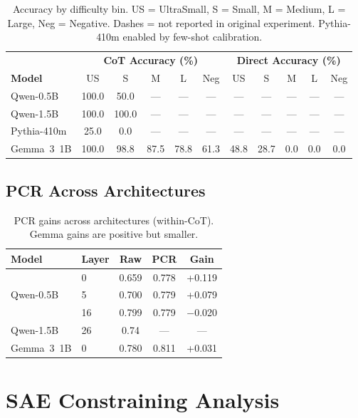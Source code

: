 \documentclass[11pt,twocolumn]{article}
\begin{document}
\begin{table}[h]
\centering
\small
\begin{tabular}{l|ccccc|ccccc}
\toprule
 & \multicolumn{5}{c|}{\textbf{CoT Accuracy (\%)}} & \multicolumn{5}{c}{\textbf{Direct Accuracy (\%)}} \\
\textbf{Model} & US & S & M & L & Neg & US & S & M & L & Neg \\
\midrule
Qwen-0.5B & 100.0 & 50.0 & --- & --- & --- & --- & --- & --- & --- & --- \\
Qwen-1.5B & 100.0 & 100.0 & --- & --- & --- & --- & --- & --- & --- & --- \\
Pythia-410m & 25.0 & 0.0 & --- & --- & --- & --- & --- & --- & --- & --- \\
Gemma~3~1B & 100.0 & 98.8 & 87.5 & 78.8 & 61.3 & 48.8 & 28.7 & 0.0 & 0.0 & 0.0 \\
\bottomrule
\end{tabular}
\caption{Accuracy by difficulty bin. US = UltraSmall, S = Small, M = Medium, L = Large, Neg = Negative. Dashes = not reported in original experiment. Pythia-410m enabled by few-shot calibration.}
\label{tab:accuracy_detail}
\end{table}

\subsection{PCR Across Architectures}

\begin{table}[h]
\centering
\small
\begin{tabular}{llccc}
\toprule
\textbf{Model} & \textbf{Layer} & \textbf{Raw} & \textbf{PCR} & \textbf{Gain} \\
\midrule
\multirow{3}{*}{Qwen-0.5B} & 0 & 0.659 & 0.778 & +0.119 \\
 & 5 & 0.700 & 0.779 & +0.079 \\
 & 16 & 0.799 & 0.779 & $-$0.020 \\
\midrule
Qwen-1.5B & 26 & 0.74 & --- & --- \\
\midrule
Gemma~3~1B & 0 & 0.780 & 0.811 & +0.031 \\
\bottomrule
\end{tabular}
\caption{PCR gains across architectures (within-CoT). Gemma gains are positive but smaller.}
\label{tab:pcr_cross}
\end{table}


\section{SAE Constraining Analysis}
\label{app:sae}
\end{document}
